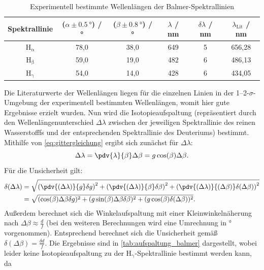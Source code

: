 \begin{table}[H]
    \centering
    \caption{Experimentell bestimmte Wellenlängen der Balmer-Spektrallinien}
    \begin{tabular}{c|c|c|c|c|c}
        Spektrallinie & ($\alpha \pm \SI{0,5}{\degree}$) / \unit{\degree} & ($\beta \pm \SI{0,8}{\degree}$) / \unit{\degree} & $\lambda$ / \unit{\nano \meter} & $\delta \lambda$ / \unit{\nano \meter} & $\lambda_{\mathrm{Lit}}$ / \unit{\nano \meter} \\
        \hline
        $\mathrm{H_{\alpha}}$ & 78,0 & 38,0 & 649 & 5 & 656,28 \\
        $\mathrm{H_{\beta}}$ & 59,0 & 19,0 & 482 & 6 & 486,13 \\
        $\mathrm{H_{\gamma}}$ & 54,0 & 14,0 & 428 & 6 & 434,05
    \end{tabular}\label{tab:wellenlangen_balmer}
\end{table} Die Literaturwerte der Wellenlängen liegen für die einzelnen Linien in der 1--2-$\sigma$-Umgebung der experimentell bestimmten Wellenlängen, womit hier gute Ergebnisse erzielt wurden.\newline
\indent Nun wird die Isotopieaufspaltung (repräsentiert durch den Wellenlängenunterschied $\Delta \lambda$ zwischen der jeweiligen Spektrallinie des reinen Wasserstofffs und der entsprechenden
Spektrallinie des Deuteriums) bestimmt. Mithilfe von \ref{eq:gittergleichung} ergibt sich zunächst für $\Delta \lambda$:
\begin{equation}\label{eq:isotopieaufspaltung}
    \Delta \lambda = \pdv{\lambda}{\beta} \Delta \beta = g \cos(\beta) \Delta \beta .
\end{equation} Für die Unsicherheit gilt:
\begin{align*}
    \delta (\Delta \lambda) &= \sqrt{\left(\pdv{(\Delta \lambda)}{g} \delta g\right)^2 + \left(\pdv{(\Delta \lambda)}{\beta} \delta \beta\right)^2 + \left(\pdv{(\Delta \lambda)}{(\Delta \beta)} \delta (\Delta \beta)\right)^2} \\
    &= \sqrt{(\cos(\beta) \Delta \beta \delta g)^2 + (g \sin(\beta) \Delta \beta \delta \beta)^2 + (g \cos(\beta) \delta (\Delta \beta))^2} .
\end{align*} Außerdem berechnet sich die Winkelaufspaltung mit einer Kleinwinkelnäherung nach $\Delta \beta \approx \frac{d}{f}$ (bei den weiteren Berechnungen wird
eine Umrechnung in \unit{\degree} vorgenommen). Entsprechend berechnet sich die Unsicherheit gemäß $\delta (\Delta \beta) = \frac{\delta d}{f}$. Die Ergebnisse
sind in \cref{tab:aufspaltung_balmer} dargestellt, wobei leider keine Isotopieaufspaltung zu der $\mathrm{H_{\mathrm{\gamma}}}$-Spektrallinie bestimmt werden kann, da
